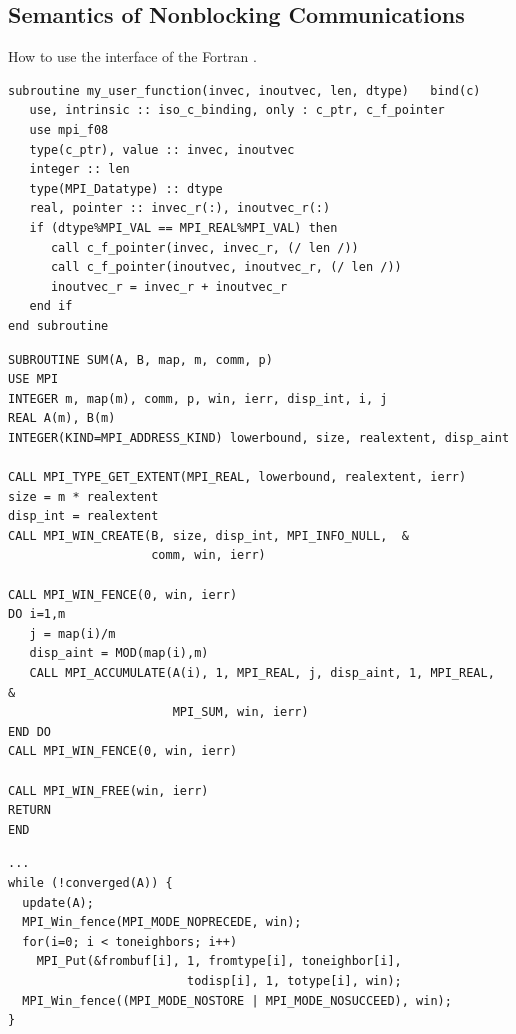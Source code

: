 \begin{example}
\subsection{Semantics of Nonblocking Communications}
\label{subsec:pt2pt-semantics}

\begin{example}
\label{coll-exX-fortran}
%
%
%
%
How to use the  interface of the Fortran .
\begin{lstlisting}[language={[MPI08]Fortran}]
subroutine my_user_function(invec, inoutvec, len, dtype)   bind(c)
   use, intrinsic :: iso_c_binding, only : c_ptr, c_f_pointer
   use mpi_f08
   type(c_ptr), value :: invec, inoutvec
   integer :: len
   type(MPI_Datatype) :: dtype
   real, pointer :: invec_r(:), inoutvec_r(:)
   if (dtype%MPI_VAL == MPI_REAL%MPI_VAL) then
      call c_f_pointer(invec, invec_r, (/ len /))
      call c_f_pointer(inoutvec, inoutvec_r, (/ len /))
      inoutvec_r = invec_r + inoutvec_r
   end if
end subroutine
\end{lstlisting}
\end{example}

\begin{lstlisting}[language={[MPI]Fortran}]
SUBROUTINE SUM(A, B, map, m, comm, p)
USE MPI
INTEGER m, map(m), comm, p, win, ierr, disp_int, i, j
REAL A(m), B(m)
INTEGER(KIND=MPI_ADDRESS_KIND) lowerbound, size, realextent, disp_aint

CALL MPI_TYPE_GET_EXTENT(MPI_REAL, lowerbound, realextent, ierr)
size = m * realextent
disp_int = realextent
CALL MPI_WIN_CREATE(B, size, disp_int, MPI_INFO_NULL,  &
                    comm, win, ierr)

CALL MPI_WIN_FENCE(0, win, ierr)
DO i=1,m
   j = map(i)/m
   disp_aint = MOD(map(i),m)
   CALL MPI_ACCUMULATE(A(i), 1, MPI_REAL, j, disp_aint, 1, MPI_REAL,   &
                       MPI_SUM, win, ierr)
END DO
CALL MPI_WIN_FENCE(0, win, ierr)

CALL MPI_WIN_FREE(win, ierr)
RETURN
END
\end{lstlisting}

\begin{lstlisting}[language={[MPI]C}]
...
while (!converged(A)) {
  update(A);
  MPI_Win_fence(MPI_MODE_NOPRECEDE, win);
  for(i=0; i < toneighbors; i++)
    MPI_Put(&frombuf[i], 1, fromtype[i], toneighbor[i],
                         todisp[i], 1, totype[i], win);
  MPI_Win_fence((MPI_MODE_NOSTORE | MPI_MODE_NOSUCCEED), win);
}
\end{lstlisting}


\end{example}
